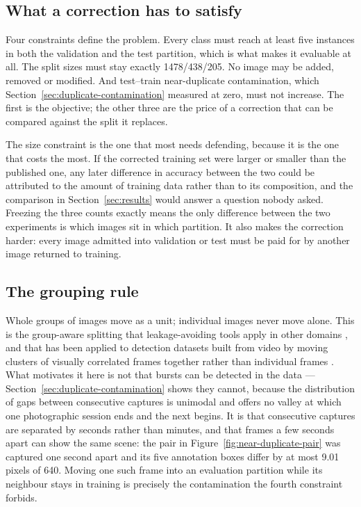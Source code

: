 \subsection{What a correction has to satisfy}
\label{sec:correction-constraints}

Four constraints define the problem. Every class must reach at least five
instances in both the validation and the test partition, which is what makes it
evaluable at all. The split sizes must stay exactly 1478/438/205. No image may
be added, removed or modified. And test--train near-duplicate contamination,
which Section~\ref{sec:duplicate-contamination} measured at zero, must not
increase. The first is the objective; the other three are the price of a
correction that can be compared against the split it replaces.

The size constraint is the one that most needs defending, because it is the one
that costs the most. If the corrected training set were larger or smaller than
the published one, any later difference in accuracy between the two could be
attributed to the amount of training data rather than to its composition, and
the comparison in Section~\ref{sec:results} would answer a question nobody
asked. Freezing the three counts exactly means the only difference between the
two experiments is which images sit in which partition. It also makes the
correction harder: every image admitted into validation or test must be paid for
by another image returned to training.

\subsection{The grouping rule}
\label{sec:grouping-rule}

Whole groups of images move as a unit; individual images never move alone. This
is the group-aware splitting that leakage-avoiding tools apply in other domains
\citep{joeres2025datasail}, and that has been applied to detection datasets built
from video by moving clusters of visually correlated frames together rather than
individual frames \citep{figueiredo2024leakage}. What motivates it here is not
that bursts can be
detected in the data ---
Section~\ref{sec:duplicate-contamination} shows they cannot, because the
distribution of gaps between consecutive captures is unimodal and offers no
valley at which one photographic session ends and the next begins. It is that
consecutive captures are separated by seconds rather than minutes, and that
frames a few seconds apart can show the same scene: the pair in
Figure~\ref{fig:near-duplicate-pair} was captured one second apart and its five
annotation boxes differ by at most 9.01 pixels of 640. Moving one such frame
into an evaluation partition while its neighbour stays in training is precisely
the contamination the fourth constraint forbids.

